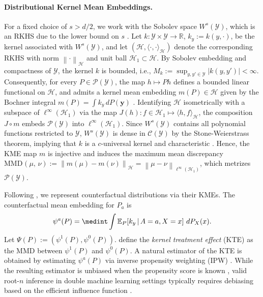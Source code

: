 \documentclass{article}
\theoremstyle{plain}
\theoremstyle{definition}
\theoremstyle{remark}
\newcommand{\R}{\mathbb{R}}
\newcommand{\of}[1]{\left(#1\right)}
\newcommand{\cH}{\mathcal{H}}
\newcommand{\cP}{\mathcal{P}}
\newcommand{\cC}{\mathcal{C}}
\newcommand{\cY}{\mathcal{Y}}
\newcommand{\by}{\mathbf{y}}
\newcommand{\1}{\mathbbm{1}}
\newcommand{\MMD}[3]{\text{MMD}^{#1}\of{#2,\, #3}}
\newcommand{\norm}[1]{\left \| #1 \right \|}
\theoremstyle{plain}
\theoremstyle{definition}
\newcommand{\mymid}{\,|\,}
\begin{document}
\paragraph{Distributional Kernel Mean Embeddings.}
For a fixed choice of $s>d/2$, we work with the Sobolev space $W^s(\cY)$, which is an RKHS due to the lower bound on $s$ \citep[Thm.~4.12]{adams2003sobolev}. 
Let $k: \cY \times \cY \to \R$, $k_y := k(y, \cdot)$, be the kernel associated with $W^s(\cY)$, and let $\of{\cH, \langle{\cdot, \cdot}\rangle_\cH}$ denote the corresponding RKHS with norm $\norm{\cdot}_\cH$ and unit ball $\cH_1 \subset \cH$. By Sobolev embedding and compactness of $\cY$, the kernel $k$ is bounded, i.e., $M_k := \sup_{y,y' \in \cY} |k(y,y')| < \infty$. Consequently, for every $P \in \cP(\cY)$, the map $h \mapsto Ph$ defines a bounded linear functional on $\cH$, and admits a kernel mean embedding $m(P) \in \cH$ given by the Bochner integral $m(P) = \int k_y \, dP(\by)$
\cite{smola2007hilbert, sriperumbudur2010hilbert}. Identifying $\cH$ isometrically with a subspace of $\ell^\infty(\cH_1)$ via the map $J(h): f\in \cH_1 \mapsto \langle h, f\rangle_\cH$, the composition $J \circ m$ embeds $\cP(\cY)$ into $\ell^\infty(\cH_1)$. Since $W^s(\cY)$ contains all polynomial functions restricted to $\cY$, $W^s(\cY)$ is dense in $\cC(\cY)$ by the Stone-Weierstrass theorem, implying that $k$ is a $c$-universal kernel \citep[Thm.~9]{steinwart2001influence} and characteristic \citep{micchelli2006universal}. Hence, the KME map $m$ is injective and induces the maximum mean discrepancy $\MMD{}{\mu}{\nu} := \norm{m(\mu) - m(\nu)}_\cH = \norm{\mu - \nu}_{\ell^\infty(\cH_1)}$, which metrizes $\cP(\cY)$. 

Following \citet{muandet2017kernel}, we represent counterfactual distributions via their KMEs. 
The counterfactual mean embedding for $P_a$ is
\begin{equation}\label{eq:CME}
\psi^a(P) = \medint\int 
\mathbb E_P\!\left[k_y\mymid A=a, X=x\right] \, dP_X(x).
\end{equation}
Let $\Psi(P) := \of{\psi^1(P), \psi^0(P)}$.
\citet{muandet2021counterfactual} define the \emph{kernel treatment effect} (KTE) as the MMD between $\psi^1(P)$ and $\psi^0(P)$. A natural estimator of the KTE is obtained by estimating $\psi^a(P)$ via inverse propensity weighting (IPW) \cite{imbens2004nonparametric}. While the resulting estimator is unbiased when the propensity score is known \citep[Thm.~5]{muandet2017kernel}, valid root-$n$ inference in double machine learning settings typically requires debiasing based on the efficient influence function \citep{luedtke2024one}. 
\end{document}
